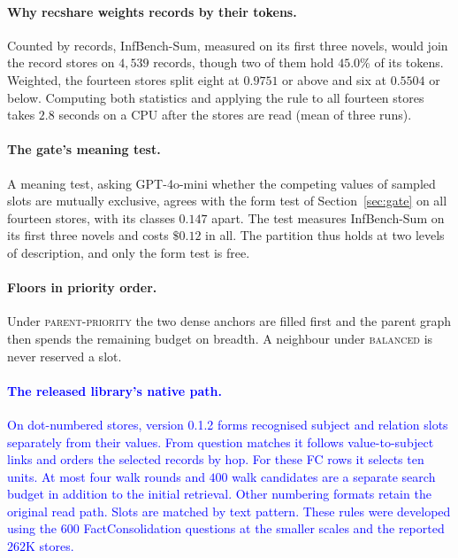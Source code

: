 \documentclass{article}
\newcommand{\nativechange}[1]{\textcolor{blue}{#1}}
\newcommand{\cov}{\textsf{recshare}}
\newcommand{\balanced}{\textsc{balanced}}
\newcommand{\parprio}{\textsc{parent-priority}}
\begin{document}
\paragraph{Why \cov{} weights records by their tokens.} Counted by records, InfBench-Sum, measured on its first three novels, would join the record stores on $4{,}539$ records, though two of them hold $45.0\%$ of its tokens. Weighted, the fourteen stores split eight at $0.9751$ or above and six at $0.5504$ or below. Computing both statistics and applying the rule to all fourteen stores takes $2.8$ seconds on a CPU after the stores are read (mean of three runs).

\paragraph{The gate's meaning test.} A meaning test, asking GPT-4o-mini whether the competing values of sampled slots are mutually exclusive, agrees with the form test of Section~\ref{sec:gate} on all fourteen stores, with its classes $0.147$ apart. The test measures InfBench-Sum on its first three novels and costs $\$0.12$ in all. The partition thus holds at two levels of description, and only the form test is free.

\paragraph{Floors in priority order.} Under \parprio{} the two dense anchors are filled first and the parent graph then spends the remaining budget on breadth. A neighbour under \balanced{} is never reserved a slot.

\paragraph{\nativechange{The released library's native path.}} \nativechange{On dot-numbered stores, version 0.1.2 forms recognised subject and relation slots separately from their values. From question matches it follows value-to-subject links and orders the selected records by hop. For these FC rows it selects ten units. At most four walk rounds and $400$ walk candidates are a separate search budget in addition to the initial retrieval. Other numbering formats retain the original read path. Slots are matched by text pattern. These rules were developed using the $600$ FactConsolidation questions at the smaller scales and the reported $262$K stores.}
\end{document}
